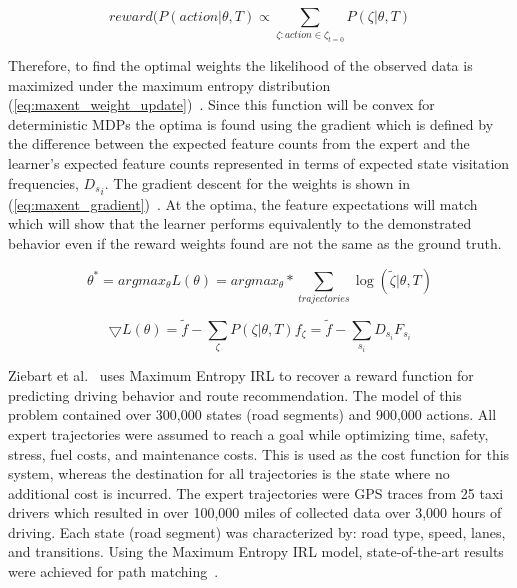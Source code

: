 \documentclass[12pt,american]{report}
\begin{document}
\begin{equation}
            \label{eq:stochastic_policy}
            reward(P(action | \theta, T) \propto \sum_{\zeta:action\in\zeta_{t=0}}^{}P(\zeta | \theta, T)%
        \end{equation}

Therefore, to find the optimal weights the likelihood of the observed data is maximized under the maximum entropy distribution (\ref{eq:maxent_weight_update})~\cite{ziebart2008maximum}. Since this function will be convex for deterministic MDPs the optima is found using the gradient  which is defined by the difference between the expected feature counts from the expert and the learner's expected feature counts represented in terms of expected state visitation frequencies, ${{}D_s}_{i}$.  The gradient descent for the weights is shown in (\ref{eq:maxent_gradient})~\cite{ziebart2008maximum}. At the optima, the feature expectations will match which will show that the learner performs equivalently to the demonstrated behavior even if the reward weights found are not the same as the ground truth.

\begin{equation}
            \label{eq:maxent_weight_update}
            \theta^* = argmax_\theta L(\theta) = argmax_\theta * \sum_{trajectories}^{}\log(\tilde\zeta|\theta,T)%
        \end{equation}

\begin{equation}
            \label{eq:maxent_gradient}
            \bigtriangledown L(\theta) = \tilde f - \sum_{\zeta}^{} P(\zeta|\theta,T)f_\zeta = \tilde f - \sum_{s_i}^{}D_{s_{i}}F_{s_{i}}%
        \end{equation}

Ziebart et al.~\cite{ziebart2008maximum} uses Maximum Entropy IRL to recover a reward function for predicting driving behavior and route recommendation. The model of this problem contained over 300,000 states (road segments) and 900,000 actions. All expert trajectories were assumed to reach a goal while optimizing time, safety, stress, fuel costs, and maintenance costs. This is used as the cost function for this system, whereas the destination for all trajectories is the state where no additional cost is incurred. The expert trajectories were GPS traces from 25 taxi drivers which resulted in over 100,000 miles of collected data over 3,000 hours of driving. Each state (road segment) was characterized by: road type, speed, lanes, and transitions. Using the Maximum Entropy IRL model, state-of-the-art results were achieved for path matching~\cite{ziebart2008maximum}.
\end{document}
